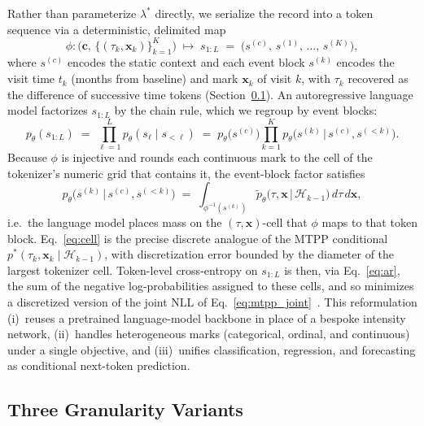 \documentclass{article}
\newcommand{\Hcal}{\mathcal{H}}
\begin{document}
Rather than parameterize $\lambda^*$ directly, we serialize the record into a token sequence via a deterministic, delimited map
\[
    \phi \colon \bigl(\mathbf{c},\, \{(\tau_k, \mathbf{x}_k)\}_{k=1}^K\bigr)
    \;\longmapsto\;
    s_{1:L} \;=\; \bigl(s^{(c)},\, s^{(1)},\, \ldots,\, s^{(K)}\bigr),
\]
where $s^{(c)}$ encodes the static context and each event block $s^{(k)}$ encodes the visit time $t_k$ (months from baseline) and mark $\mathbf{x}_k$ of visit $k$, with $\tau_k$ recovered as the difference of successive time tokens (Section~\ref{sec:tokenization}).
An autoregressive language model factorizes $s_{1:L}$ by the chain rule, which we regroup by event blocks:
\begin{equation}
    p_\theta(s_{1:L})
    \;=\; \prod_{\ell=1}^{L} p_\theta(s_\ell \mid s_{<\ell})
    \;=\; p_\theta\!\bigl(s^{(c)}\bigr) \prod_{k=1}^{K} p_\theta\!\bigl(s^{(k)} \,\big|\, s^{(c)}, s^{(<k)}\bigr).
    \label{eq:ar}
\end{equation}
Because $\phi$ is injective and rounds each continuous mark to the cell of the tokenizer's numeric grid that contains it, the event-block factor satisfies
\begin{equation}
    p_\theta\!\bigl(s^{(k)} \,\big|\, s^{(c)}, s^{(<k)}\bigr)
    \;=\; \int_{\phi^{-1}(s^{(k)})}\!\!
          \tilde p_\theta\!\bigl(\tau, \mathbf{x} \,\big|\, \Hcal_{k-1}\bigr) \,d\tau\,d\mathbf{x},
    \label{eq:cell}
\end{equation}
i.e.\ the language model places mass on the $(\tau, \mathbf{x})$-cell that $\phi$ maps to that token block. Eq.~\eqref{eq:cell} is the precise discrete analogue of the MTPP conditional $p^*(\tau_k, \mathbf{x}_k \mid \Hcal_{k-1})$, with discretization error bounded by the diameter of the largest tokenizer cell.
Token-level cross-entropy on $s_{1:L}$ is then, via Eq.~\eqref{eq:ar}, the sum of the negative log-probabilities assigned to these cells, and so minimizes a discretized version of the joint NLL of Eq.~\eqref{eq:mtpp_joint}~\citep{liu2025tpp,kong2025language}.
This reformulation (i)~reuses a pretrained language-model backbone in place of a bespoke intensity network, (ii)~handles heterogeneous marks (categorical, ordinal, and continuous) under a single objective, and (iii)~unifies classification, regression, and forecasting as conditional next-token prediction.

\subsection{Three Granularity Variants}
\label{sec:tokenization}
\end{document}
